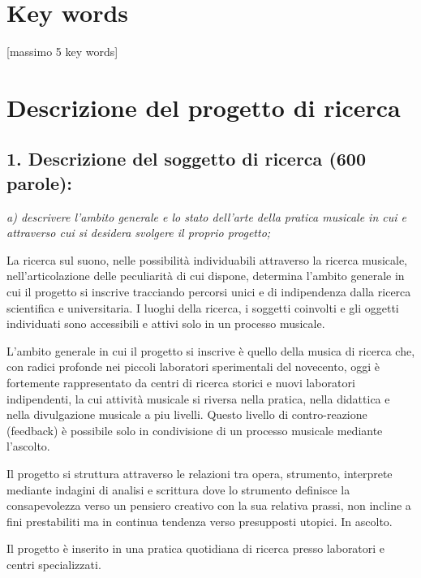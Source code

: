 \documentclass{gs-adonis}
\begin{document}
%
%


\section{Key words}

[massimo 5 key words]


\section{Descrizione del progetto di ricerca}%

\subsection{1. Descrizione del soggetto di ricerca (600 parole):}

\emph{a) descrivere l’ambito generale e lo stato dell’arte della pratica musicale in cui e attraverso cui si desidera svolgere il proprio progetto;}

La ricerca sul suono, nelle possibilità individuabili attraverso la ricerca
musicale, nell'articolazione delle peculiarità di cui dispone, determina
l'ambito generale in cui il progetto si inscrive tracciando percorsi unici e di
indipendenza dalla ricerca scientifica e universitaria. I luoghi della ricerca,
i soggetti coinvolti e gli oggetti individuati sono accessibili e attivi solo
in un processo musicale.

L'ambito generale in cui il progetto si inscrive è quello della musica di
ricerca che, con radici profonde nei piccoli laboratori sperimentali del
novecento, oggi è fortemente rappresentato da centri di ricerca storici e
nuovi laboratori indipendenti, la cui attività musicale si riversa nella
pratica, nella didattica e nella divulgazione musicale a piu livelli. Questo
livello di contro-reazione (feedback) è possibile solo in condivisione di un
processo musicale mediante l'ascolto. 

Il progetto si struttura attraverso le relazioni tra opera, strumento,
interprete mediante indagini di analisi e scrittura dove lo strumento definisce
la consapevolezza verso un pensiero creativo con la sua relativa prassi, non
incline a fini prestabiliti ma in continua tendenza verso presupposti utopici.
In ascolto.

Il progetto è inserito in una pratica quotidiana di ricerca presso laboratori
e centri specializzati.
\end{document}
